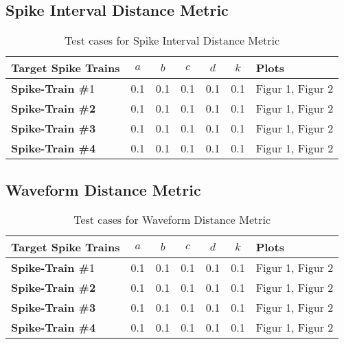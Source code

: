 \subsection{Spike Interval Distance Metric}

\begin{table}[H]
	\begin{center}
		\begin{tabular}{ | l | c | c | c | c | c | l |}
	
	    \hline
	    
	  	\textbf{Target Spike Trains} & \textbf{$a$} & \textbf{$b$} & \textbf{$c$} & \textbf{$d$} & \textbf{$k$} & \textbf{Plots} \\ \hline
	  	\textbf{Spike-Train \#}1 & 0.1 & 0.1 & 0.1 & 0.1 & 0.1 & Figur 1, Figur 2 \\ \hline
	  	\textbf{Spike-Train \#2} & 0.1 & 0.1 & 0.1 & 0.1 & 0.1 & Figur 1, Figur 2 \\ \hline
	  	\textbf{Spike-Train \#3} & 0.1 & 0.1 & 0.1 & 0.1 & 0.1 & Figur 1, Figur 2 \\ \hline
	  	\textbf{Spike-Train \#4} & 0.1 & 0.1 & 0.1 & 0.1 & 0.1 & Figur 1, Figur 2 \\  \hline
	  	
	    \end{tabular}
	
	\end{center}
    \caption{Test cases for Spike Interval Distance Metric}
\end{table}


\subsection{Waveform Distance Metric}

\begin{table}[H]
	\begin{center}
		\begin{tabular}{ | l | c | c | c | c | c | l |}
	
	    \hline
	    
	  	\textbf{Target Spike Trains} & \textbf{$a$} & \textbf{$b$} & \textbf{$c$} & \textbf{$d$} & \textbf{$k$} & \textbf{Plots} \\ \hline
	  	\textbf{Spike-Train \#}1 & 0.1 & 0.1 & 0.1 & 0.1 & 0.1 & Figur 1, Figur 2 \\ \hline
	  	\textbf{Spike-Train \#2} & 0.1 & 0.1 & 0.1 & 0.1 & 0.1 & Figur 1, Figur 2 \\ \hline
	  	\textbf{Spike-Train \#3} & 0.1 & 0.1 & 0.1 & 0.1 & 0.1 & Figur 1, Figur 2 \\ \hline
	  	\textbf{Spike-Train \#4} & 0.1 & 0.1 & 0.1 & 0.1 & 0.1 & Figur 1, Figur 2 \\  \hline
	  	
	    \end{tabular}
	
	\end{center}
    \caption{Test cases for Waveform Distance Metric}
\end{table}

